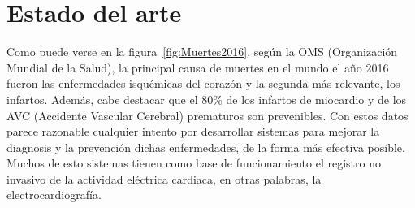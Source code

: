 
\minitoc

%
%
%
%

\section{Estado del arte}

Como puede verse en la figura~\ref{fig:Muertes2016}, según la OMS (Organización Mundial de la Salud), \cite{WHO} la principal causa de muertes en el mundo el año 2016 fueron las enfermedades isquémicas del corazón y la segunda más relevante, los infartos. Además, cabe destacar que el 80\% de los infartos de miocardio y de los AVC (Accidente Vascular Cerebral) prematuros son prevenibles. Con estos datos parece razonable cualquier intento por desarrollar sistemas para mejorar la diagnosis y la prevención dichas enfermedades, de la forma más efectiva posible. Muchos de esto sistemas tienen como base de funcionamiento el registro no invasivo de la actividad eléctrica cardiaca, en otras palabras, la electrocardiografía. 

